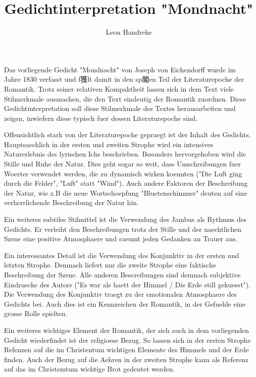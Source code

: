 \documentclass[11pt]{article}
\title{Gedichtinterpretation "Mondnacht"}
\author{Leon Handreke}
\begin{document}
\maketitle

\selectfont


Das vorliegende Gedicht "Mondnacht" von Joseph von Eichendorff wurde im Jahre 1830 verfasst und f獲lt damit in den sp閣en Teil der Literaturepoche der Romantik. Trotz seiner relativen Kompaktheit lassen sich in dem Text viele Stilmerkmale ausmachen, die den Text eindeutig der Romantik zuordnen. Diese Gedichtinterpretation soll diese Stilmerkmale des Textes herausarbeiten und zeigen, inwiefern diese typisch fuer dessen Literaturepoche sind.

Offensichtlich stark von der Literaturepoche gepraegt ist der Inhalt des Gedichts. Hauptsaechlich in der ersten und zweiten Strophe wird ein intensives Naturerlebnis des lyrischen Ichs beschrieben. Besonders hervorgehoben wird die Stille und Ruhe der Natur. Dies geht sogar so weit, dass Umschreibungen fuer Woerter verwendet werden, die zu dynamisch wirken koennten ("Die Luft ging durch die Felder", "Luft" statt "Wind"). Auch andere Faktoren der Beschreibung der Natur, wie z.B die neue Wortschoepfung "Bluetenschimmer" deuten auf eine verherrlichende Beschreibung der Natur hin.

Ein weiteres subtiles Stilmittel ist die Verwendung des Jambus als Rythmus des Gedichts. Er verleiht den Beschreibungen trotz der Stille und der naechtlichen Szene eine positive Atmosphaere und raeumt jeden Gedanken an Trauer aus.

Ein interessantes Detail ist die Verwendung des Konjunktiv in der ersten und letzten Strophe. Demnach liefert nur die zweite Strophe eine faktische Beschreibung der Szene. Alle anderen Bescreibungen sind demnach subjektive Eindruecke des Autors ("Es war als haett der Himmel / Die Erde still gekuesst"). Die Verwendung des Konjunktiv traegt zu der emotionalen Atmosphaere des Gedichts bei. Auch dies ist ein Kennzeichen der Romantik, in der Gefuehle eine grosse Rolle spielten.

Ein weiteres wichtiges Element der Romantik, der sich auch in dem vorliegenden Gedicht wiederfindet ist der religioese Bezug. So lassen sich in der ersten Strophe Refenzen auf die im Christentum wichtigen Elemente des Himmels und der Erde finden. Auch der Bezug auf die Aehren in der zweiten Strophe kann als Referenz auf das im Christemtum wichtige Brot gedeutet werden.
\end{document}
